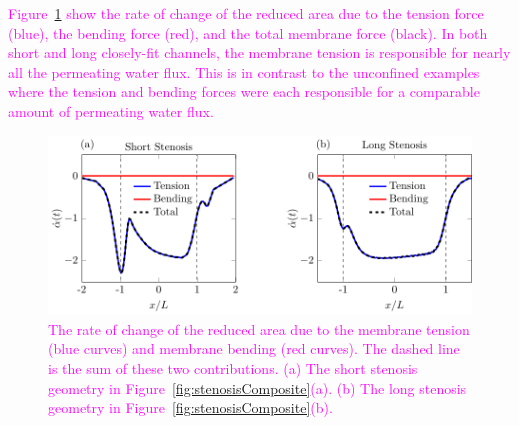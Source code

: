 \documentclass[prb,preprint,showpacs,preprintnumbers,amsmath,amssymb,longbibliography]{revtex4-1}
\newif\ifTikz
\begin{document}
\textcolor{magenta}{
Figure~\ref{fig:stenosisRAdecomp} show
the rate of change of the reduced area due to the tension force
(blue), the bending force (red), and the total membrane force (black).
In both short and long closely-fit channels, the membrane tension is
responsible for nearly all the permeating water flux. This is in contrast to
the unconfined examples where the tension and bending forces were
each responsible for a comparable amount of permeating water flux.}

\begin{figure}[htp]
  \ifTikz
  
  \else
  \includegraphics{figures/stenosisRAdecomp.pdf}
  \fi
  \caption{\label{fig:stenosisRAdecomp} \textcolor{magenta}{The rate of
  change of the reduced area due to the membrane tension (blue curves) and membrane bending (red curves).
  The dashed line is the sum of these two contributions. (a) The short
  stenosis geometry in Figure~\ref{fig:stenosisComposite}(a). (b) The
  long stenosis geometry in Figure~\ref{fig:stenosisComposite}(b).}}
\end{figure}


\end{document}
